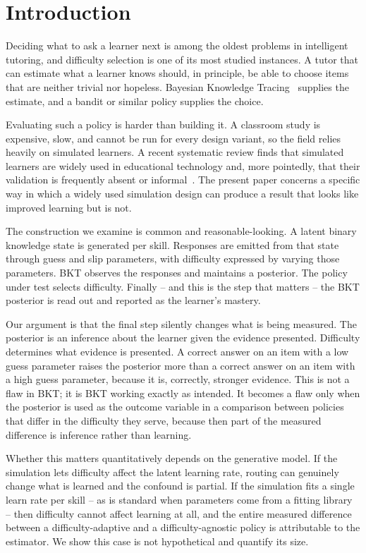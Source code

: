 \documentclass[notitlepage,12pt]{jedm}
\begin{document}
\section{Introduction}

Deciding what to ask a learner next is among the oldest problems in intelligent tutoring, and difficulty selection is one of its most studied instances. A tutor that can estimate what a learner knows should, in principle, be able to choose items that are neither trivial nor hopeless. Bayesian Knowledge Tracing~\cite{corbett1995knowledge} supplies the estimate, and a bandit or similar policy supplies the choice.

Evaluating such a policy is harder than building it. A classroom study is expensive, slow, and cannot be run for every design variant, so the field relies heavily on simulated learners. A recent systematic review finds that simulated learners are widely used in educational technology and, more pointedly, that their validation is frequently absent or informal~\cite{kaser2024simulated}. The present paper concerns a specific way in which a widely used simulation design can produce a result that looks like improved learning but is not.

The construction we examine is common and reasonable-looking. A latent binary knowledge state is generated per skill. Responses are emitted from that state through guess and slip parameters, with difficulty expressed by varying those parameters. BKT observes the responses and maintains a posterior. The policy under test selects difficulty. Finally -- and this is the step that matters -- the BKT posterior is read out and reported as the learner's mastery.

Our argument is that the final step silently changes what is being measured. The posterior is an inference about the learner given the evidence presented. Difficulty determines what evidence is presented. A correct answer on an item with a low guess parameter raises the posterior more than a correct answer on an item with a high guess parameter, because it is, correctly, stronger evidence. This is not a flaw in BKT; it is BKT working exactly as intended. It becomes a flaw only when the posterior is used as the outcome variable in a comparison between policies that differ in the difficulty they serve, because then part of the measured difference is inference rather than learning.

Whether this matters quantitatively depends on the generative model. If the simulation lets difficulty affect the latent learning rate, routing can genuinely change what is learned and the confound is partial. If the simulation fits a single learn rate per skill -- as is standard when parameters come from a fitting library~\cite{bulut2023pybkt} -- then difficulty cannot affect learning at all, and the entire measured difference between a difficulty-adaptive and a difficulty-agnostic policy is attributable to the estimator. We show this case is not hypothetical and quantify its size.
\end{document}
